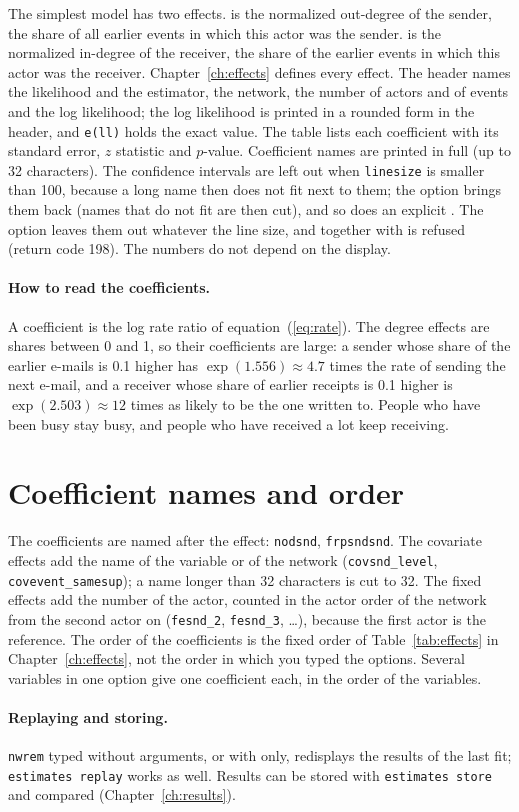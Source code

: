 The simplest model has two effects.  is the normalized out-degree of the sender, the share of all earlier events in which this actor was the sender.  is the normalized in-degree of the receiver, the share of the earlier events in which this actor was the receiver. Chapter~\ref{ch:effects} defines every effect.
The header names the likelihood and the estimator, the network, the number of actors and of events and the log likelihood; the log likelihood is printed in a rounded form in the header, and \texttt{e(ll)} holds the exact value. The table lists each coefficient with its standard error, $z$ statistic and $p$-value. Coefficient names are printed in full (up to 32 characters). The confidence intervals are left out when \texttt{linesize} is smaller than 100, because a long name then does not fit next to them; the option  brings them back (names that do not fit are then cut), and so does an explicit . The option  leaves them out whatever the line size, and  together with  is refused (return code 198). The numbers do not depend on the display.

\paragraph{How to read the coefficients.} A coefficient is the log rate ratio of equation~(\ref{eq:rate}). The degree effects are shares between 0 and 1, so their coefficients are large: a sender whose share of the earlier e-mails is 0.1 higher has $\exp(1.556)\approx 4.7$ times the rate of sending the next e-mail, and a receiver whose share of earlier receipts is 0.1 higher is $\exp(2.503)\approx 12$ times as likely to be the one written to. People who have been busy stay busy, and people who have received a lot keep receiving.

\section{Coefficient names and order}

The coefficients are named after the effect: \texttt{nodsnd}, \texttt{frpsndsnd}. The covariate effects add the name of the variable or of the network (\texttt{covsnd\_level}, \texttt{covevent\_samesup}); a name longer than 32 characters is cut to 32. The fixed effects add the number of the actor, counted in the actor order of the network from the second actor on (\texttt{fesnd\_2}, \texttt{fesnd\_3}, \dots), because the first actor is the reference. The order of the coefficients is the fixed order of Table~\ref{tab:effects} in Chapter~\ref{ch:effects}, not the order in which you typed the options. Several variables in one option give one coefficient each, in the order of the variables.

\paragraph{Replaying and storing.} \texttt{nwrem} typed without arguments, or with  only, redisplays the results of the last fit; \texttt{estimates replay} works as well. Results can be stored with \texttt{estimates store} and compared (Chapter~\ref{ch:results}).
